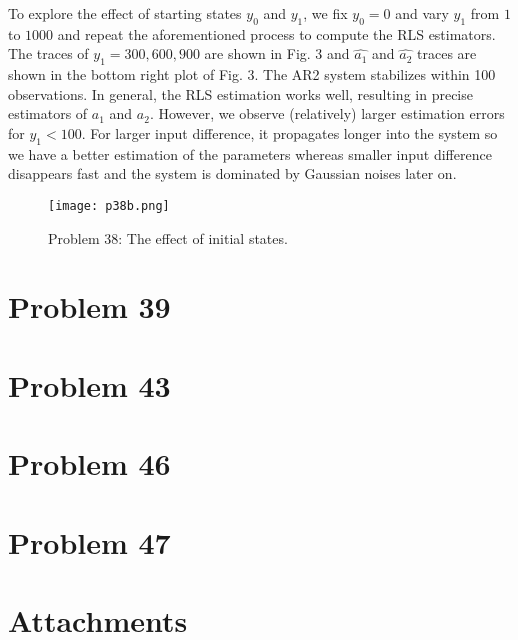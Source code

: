 \documentclass[a4paper, 11pt]{article}
\begin{document}
To explore the effect of starting states $y_0$ and $y_1$, we fix $y_0=0$ and vary $y_1$ from $1$ to $1000$ and repeat the aforementioned process to compute the RLS estimators. The traces of $y_1 = 300, 600, 900$ are shown in Fig. 3 and $\hat{a_1}$ and $\hat{a_2}$ traces are shown in the bottom right plot of Fig. 3. The AR2 system stabilizes within 100 observations. In general, the RLS estimation works well, resulting in precise estimators of $a_1$ and $a_2$. However, we observe (relatively) larger estimation errors for $y_1 < 100$. For larger input difference, it propagates longer into the system so we have a better estimation of the parameters whereas smaller input difference disappears fast and the system is dominated by Gaussian noises later on. 

\begin{figure}
	\begin{center}
		\texttt{[image: p38b.png]}
		\caption{Problem 38: The effect of initial states. }
	\end{center}
\end{figure}


 

\section*{Problem 39}




\section*{Problem 43}



\section*{Problem 46}





\section*{Problem 47}










\section*{Attachments}
	
\end{document}

